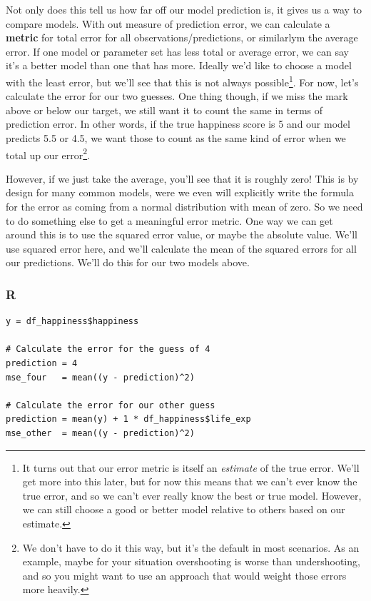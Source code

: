 \documentclass[
  letterpaper,
]{krantz}
\begin{document}
Not only does this tell us how far off our model prediction is, it gives
us a way to compare models. With out measure of prediction error, we can
calculate a \textbf{metric} for total error for all
observations/predictions, or similarlym the average error. If one model
or parameter set has less total or average error, we can say it's a
better model than one that has more. Ideally we'd like to choose a model
with the least error, but we'll see that this is not always
possible\footnote{It turns out that our error metric is itself an
  \emph{estimate} of the true error. We'll get more into this later, but
  for now this means that we can't ever know the true error, and so we
  can't ever really know the best or true model. However, we can still
  choose a good or better model relative to others based on our
  estimate.}. For now, let's calculate the error for our two guesses.
One thing though, if we miss the mark above or below our target, we
still want it to count the same in terms of prediction error. In other
words, if the true happiness score is 5 and our model predicts 5.5 or
4.5, we want those to count as the same kind of error when we total up
our error\footnote{We don't have to do it this way, but it's the default
  in most scenarios. As an example, maybe for your situation
  overshooting is worse than undershooting, and so you might want to use
  an approach that would weight those errors more heavily.}.

However, if we just take the average, you'll see that it is roughly
zero! This is by design for many common models, were we even will
explicitly write the formula for the error as coming from a normal
distribution with mean of zero. So we need to do something else to get a
meaningful error metric. One way we can get around this is to use the
squared error value, or maybe the absolute value. We'll use squared
error here, and we'll calculate the mean of the squared errors for all
our predictions. We'll do this for our two models above.

\subsubsection{R}

\begin{verbatim}
y = df_happiness$happiness

# Calculate the error for the guess of 4
prediction = 4
mse_four   = mean((y - prediction)^2)

# Calculate the error for our other guess
prediction = mean(y) + 1 * df_happiness$life_exp
mse_other  = mean((y - prediction)^2)
\end{verbatim}
\end{document}
